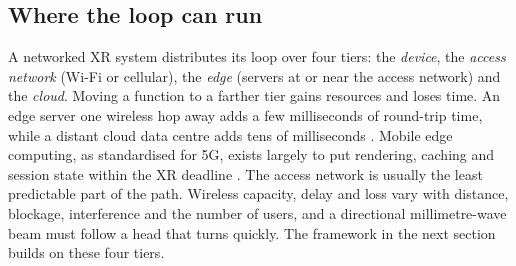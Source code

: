 \subsection{Where the loop can run}
A networked XR system distributes its loop over four tiers: the \emph{device}, the \emph{access network}
(Wi-Fi or cellular), the \emph{edge} (servers at or near the access network) and the \emph{cloud}. Moving
a function to a farther tier gains resources and loses time. An edge server one wireless hop away adds a
few milliseconds of round-trip time, while a distant cloud data centre adds tens of milliseconds
\cite{W2805833065}. Mobile edge computing, as standardised for 5G, exists largely to put rendering,
caching and session state within the XR deadline \cite{W2902319104}. The access network is usually the
least predictable part of the path. Wireless capacity, delay and loss vary with distance, blockage,
interference and the number of users, and a directional millimetre-wave beam must follow a head that
turns quickly. The framework in the next section builds on these four tiers.
